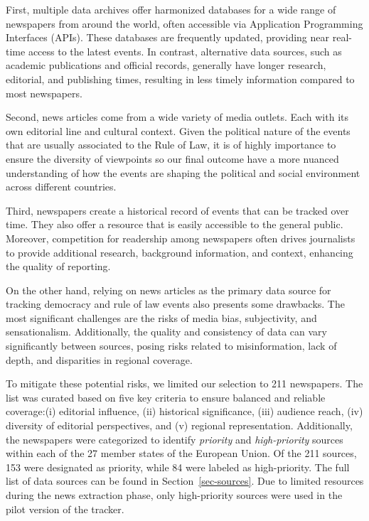 \documentclass[
]{agujournal2019}
\begin{document}
First, multiple data archives offer harmonized databases for a wide
range of newspapers from around the world, often accessible via
Application Programming Interfaces (APIs). These databases are
frequently updated, providing near real-time access to the latest
events. In contrast, alternative data sources, such as academic
publications and official records, generally have longer research,
editorial, and publishing times, resulting in less timely information
compared to most newspapers.

Second, news articles come from a wide variety of media outlets. Each
with its own editorial line and cultural context. Given the political
nature of the events that are usually associated to the Rule of Law, it
is of highly importance to ensure the diversity of viewpoints so our
final outcome have a more nuanced understanding of how the events are
shaping the political and social environment across different countries.

Third, newspapers create a historical record of events that can be
tracked over time. They also offer a resource that is easily accessible
to the general public. Moreover, competition for readership among
newspapers often drives journalists to provide additional research,
background information, and context, enhancing the quality of reporting.

On the other hand, relying on news articles as the primary data source
for tracking democracy and rule of law events also presents some
drawbacks. The most significant challenges are the risks of media bias,
subjectivity, and sensationalism. Additionally, the quality and
consistency of data can vary significantly between sources, posing risks
related to misinformation, lack of depth, and disparities in regional
coverage.

To mitigate these potential risks, we limited our selection to 211
newspapers. The list was curated based on five key criteria to ensure
balanced and reliable coverage:(i) editorial influence, (ii) historical
significance, (iii) audience reach, (iv) diversity of editorial
perspectives, and (v) regional representation. Additionally, the
newspapers were categorized to identify \emph{priority} and
\emph{high-priority} sources within each of the 27 member states of the
European Union. Of the 211 sources, 153 were designated as priority,
while 84 were labeled as high-priority. The full list of data sources
can be found in Section~\ref{sec-sources}. Due to limited resources
during the news extraction phase, only high-priority sources were used
in the pilot version of the tracker.
\end{document}
